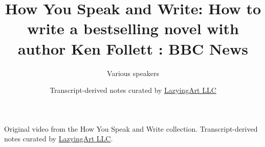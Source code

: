 \documentclass[11pt,oneside]{book}
\begin{document}
\frontmatter
\title{How You Speak and Write: How to write a bestselling novel with author Ken Follett : BBC News}
\author{Various speakers}
\date{Transcript-derived notes curated by \href{https://lazying.art}{LazyingArt LLC}}
\maketitle
\begin{center}
\small Original video from the How You Speak and Write collection. Transcript-derived notes curated by \href{https://lazying.art}{LazyingArt LLC}.
\end{center}
\clearpage
\mainmatter

\end{document}
